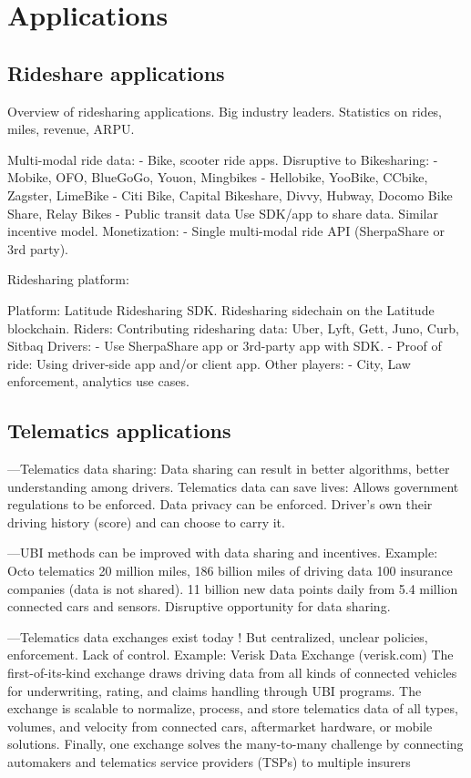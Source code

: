 \section{Applications}
\label{sec:apps}

\subsection{Rideshare applications}

Overview of ridesharing applications. Big industry leaders. Statistics on rides, miles, revenue, ARPU.

Multi-modal ride data:
 - Bike, scooter ride apps.
Disruptive to Bikesharing:
 - Mobike, OFO, BlueGoGo, Youon, Mingbikes
 - Hellobike, YooBike, CCbike, Zagster, LimeBike
 - Citi Bike, Capital Bikeshare, Divvy, Hubway, Docomo Bike
Share, Relay Bikes
 - Public transit data
Use SDK/app to share data. Similar incentive model.
Monetization:
 - Single multi-modal ride API (SherpaShare or 3rd party).

 Ridesharing platform:

 Platform:
Latitude Ridesharing SDK.
Ridesharing sidechain on the Latitude blockchain.
Riders:
Contributing ridesharing data:
Uber, Lyft, Gett, Juno, Curb, Sitbaq
Drivers:
 - Use SherpaShare app or 3rd-party app with SDK.
 - Proof of ride:
Using driver-side app and/or client app.
Other players:
 - City, Law enforcement, analytics use cases.

\subsection{Telematics applications}

---Telematics data sharing:
Data sharing can result in better algorithms, better understanding among drivers.
Telematics data can save lives:
Allows government regulations to be enforced. Data privacy can be enforced.
Driver’s own their driving history (score) and can choose to carry it.


---UBI methods can be improved with data sharing and incentives.
Example:
Octo telematics
20 million miles, 186 billion miles of driving data
100 insurance companies (data is not shared).
11 billion new data points daily from 5.4 million connected cars and sensors.
Disruptive opportunity for data sharing.



---Telematics data exchanges exist today !
But centralized, unclear policies, enforcement.
 Lack of control.
 Example: Verisk Data Exchange (verisk.com)
 The first-of-its-kind  exchange draws driving data from all kinds of connected vehicles for underwriting, rating, and
 claims handling through UBI programs. 
 The exchange is scalable to normalize, process, and store telematics data of all types, volumes, and velocity from
 connected cars, aftermarket hardware, or mobile solutions.
 Finally, one exchange solves the many-to-many challenge by connecting automakers and telematics service providers
 (TSPs) to multiple insurers


